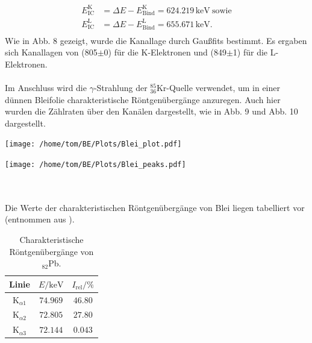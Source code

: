 \documentclass[german,  %
parskip=full,  %
]{scrartcl}
\begin{document}
\begin{align*}
E_{\mathrm{IC}}^{\mathrm{K}} &= \Delta E - E_{\mathrm{Bind}}^{\mathrm{K}} = 624.219\,\mathrm{keV} \ \text{sowie}\\
E_{\mathrm{IC}}^{\mathrm{L}} &= \Delta E - E_{\mathrm{Bind}}^{\mathrm{L}} = 655.671\,\mathrm{keV}. \\
\end{align*}
Wie in Abb. 8 gezeigt, wurde die Kanallage durch Gaußfits bestimmt. Es ergaben sich Kanallagen von (805\(\pm\)0) für die K-Elektronen und (849\(\pm\)1) für die L-Elektronen.\\\\
Im Anschluss wird die \(\gamma\)-Strahlung der \(^{85}_{36}\)Kr-Quelle verwendet, um in einer dünnen Bleifolie charakteristische Röntgenübergänge anzuregen. Auch hier wurden die Zählraten über den Kanälen dargestellt, wie in Abb. 9 und Abb. 10  dargestellt. \\
\begin{minipage}{0.5\textwidth}\centering
\texttt{[image: /home/tom/BE/Plots/Blei\_plot.pdf]}
\end{minipage}
\begin{minipage}{0.5\textwidth}\centering
\texttt{[image: /home/tom/BE/Plots/Blei\_peaks.pdf]}
\end{minipage} \\\\
Die Werte der charakteristischen Röntgenübergänge von Blei liegen tabelliert vor (entnommen aus \cite{Anleitung}).\\
\begin{table}[h!]\centering
\begin{tabular}{|c|c|c|}
\hline
Linie & \(E/\mathrm{keV}\) & \(I_{\mathrm{rel}}/\%\) \\\hline
\(\mathrm{K}_{\alpha 1}\) & \(74.969\) & \(46.80\) \\\hline
\(\mathrm{K}_{\alpha 2}\) & \(72.805\) & \(27.80\) \\\hline
\(\mathrm{K}_{\alpha 3}\) & \(72.144\) & \(0.043\) \\\hline
\end{tabular}
\caption{Charakteristische Röntgenübergänge von \(_{82}\)Pb.}
\end{table} \\\\
\end{document}

